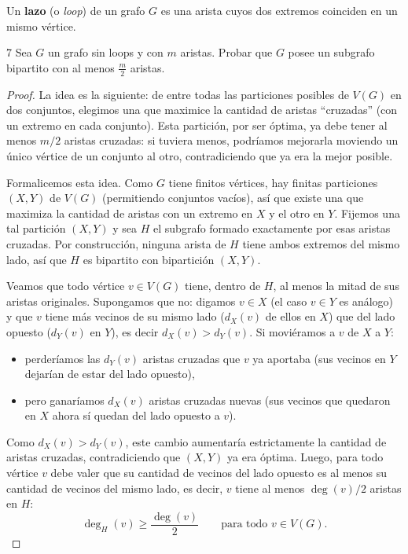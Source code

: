\vspace{0.5cm}

\begin{definition}
    Un \textbf{lazo} (o \emph{loop}) de un grafo \( G \) es una arista cuyos dos extremos coinciden en un mismo vértice.
\end{definition}

\begin{ejercicio}{7}
    Sea \( G \) un grafo sin loops y con \( m \) aristas. Probar que \( G \) posee un subgrafo bipartito con al menos \( \frac{m}{2} \) aristas.
\end{ejercicio}
\begin{proof}
    La idea es la siguiente: de entre todas las particiones posibles de \(V(G)\) en dos conjuntos, elegimos una que maximice la cantidad de aristas ``cruzadas'' (con un extremo en cada conjunto). Esta partición, por ser óptima, ya debe tener al menos \(m/2\) aristas cruzadas: si tuviera menos, podríamos mejorarla moviendo un único vértice de un conjunto al otro, contradiciendo que ya era la mejor posible.

    Formalicemos esta idea. Como \(G\) tiene finitos vértices, hay finitas particiones \((X, Y)\) de \(V(G)\) (permitiendo conjuntos vacíos), así que existe una que maximiza la cantidad de aristas con un extremo en \(X\) y el otro en \(Y\). Fijemos una tal partición \((X, Y)\) y sea \(H\) el subgrafo formado exactamente por esas aristas cruzadas. Por construcción, ninguna arista de \(H\) tiene ambos extremos del mismo lado, así que \(H\) es bipartito con bipartición \((X, Y)\).

    Veamos que todo vértice \(v \in V(G)\) tiene, dentro de \(H\), al menos la mitad de sus aristas originales. Supongamos que no: digamos \(v \in X\) (el caso \(v \in Y\) es análogo) y que \(v\) tiene más vecinos de su mismo lado (\(d_X(v)\) de ellos en \(X\)) que del lado opuesto (\(d_Y(v)\) en \(Y\)), es decir \(d_X(v) > d_Y(v)\). Si moviéramos a \(v\) de \(X\) a \(Y\):
    \begin{itemize}
        \item perderíamos las \(d_Y(v)\) aristas cruzadas que \(v\) ya aportaba (sus vecinos en \(Y\) dejarían de estar del lado opuesto),
        \item pero ganaríamos \(d_X(v)\) aristas cruzadas nuevas (sus vecinos que quedaron en \(X\) ahora sí quedan del lado opuesto a \(v\)).
    \end{itemize}
    Como \(d_X(v) > d_Y(v)\), este cambio aumentaría estrictamente la cantidad de aristas cruzadas, contradiciendo que \((X,Y)\) ya era óptima. Luego, para todo vértice \(v\) debe valer que su cantidad de vecinos del lado opuesto es al menos su cantidad de vecinos del mismo lado, es decir, \(v\) tiene al menos \(\deg(v)/2\) aristas en \(H\):
    \[
        \deg_H(v) \geq \frac{\deg(v)}{2} \qquad \text{para todo } v \in V(G).
    \]


\end{proof}
